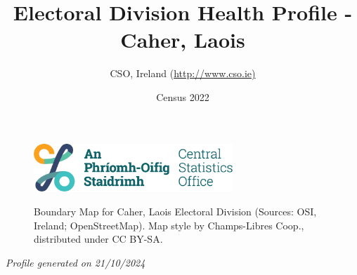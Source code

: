 \documentclass{article}
\title{Electoral Division Health Profile - Caher, Laois}
\date{Census 2022}
\author{CSO, Ireland  (\url{http://www.cso.ie)}}
\begin{document}


\begin{figure}
	\centering
\includegraphics[width =75mm]{../figures/CSO_Logo.png}
\end{figure}

\begin{figure}[h]
	\centering
	\setlength{\fboxsep}{1pt}
	\caption{\normalsize Boundary Map for Caher, Laois Electoral Division (Sources: OSI, Ireland; OpenStreetMap). Map style by Champs-Libres Coop., distributed under CC BY-SA.}
	\label{fig:2ae19629-1a6a-13a3-e055-000000000001}
	\end{figure}
	{\let\newpage\relax\maketitle}
	     \begin{center}
         \emph{Profile generated on 21/10/2024}
     \end{center}
\end{document}
